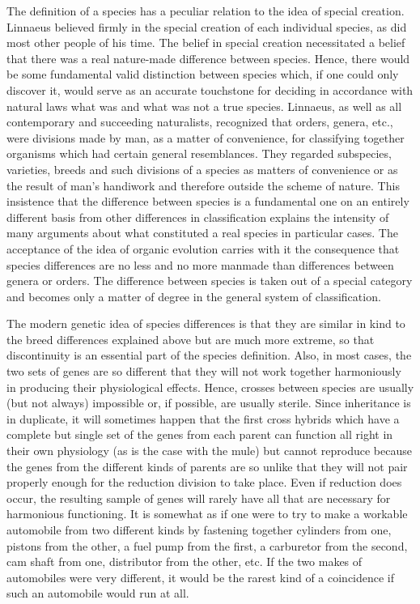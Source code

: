 The definition of a species has a peculiar relation to the idea of special
creation. Linnaeus believed firmly in the special creation of each
individual species, as did most other people of his time. The belief in
special creation necessitated a belief that there was a real nature-made
difference between species. Hence, there would be some fundamental
valid distinction between species which, if one could only discover it,
would serve as an accurate touchstone for deciding in accordance with
natural laws what was and what was not a true species. Linnaeus, as
well as all contemporary and succeeding naturalists, recognized that
orders, genera, etc., were divisions made by man, as a matter of convenience,
for classifying together organisms which had certain general
resemblances. They regarded subspecies, varieties, breeds and such divisions
of a species as matters of convenience or as the result of man's
handiwork and therefore outside the scheme of nature. This insistence
that the difference between species is a fundamental one on an entirely
different basis from other differences in classification explains the intensity
of many arguments about what constituted a real species in particular
cases. The acceptance of the idea of organic evolution carries with it
the consequence that species differences are no less and no more manmade
than differences between genera or orders. The difference
between species is taken out of a special category and becomes only a
matter of degree in the general system of classification.

The modern genetic idea of species differences is that they are similar
in kind to the breed differences explained above but are much more
extreme, so that discontinuity is an essential part of the species definition.
Also, in most cases, the two sets of genes are so different that they
will not work together harmoniously in producing their physiological
effects. Hence, crosses between species are usually (but not always)
impossible or, if possible, are usually sterile. Since inheritance is in duplicate,
it will sometimes happen that the first cross hybrids which have a
complete but single set of the genes from each parent can function all
right in their own physiology (as is the case with the mule) but cannot
reproduce because the genes from the different kinds of parents are so
unlike that they will not pair properly enough for the reduction division
to take place. Even if reduction does occur, the resulting sample of
genes will rarely have all that are necessary for harmonious functioning.
It is somewhat as if one were to try to make a workable automobile
from two different kinds by fastening together cylinders from one, pistons
from the other, a fuel pump from the first, a carburetor from the
second, cam shaft from one, distributor from the other, etc. If the two
makes of automobiles were very different, it would be the rarest kind of
a coincidence if such an automobile would run at all.

